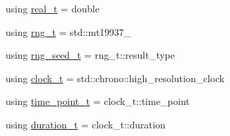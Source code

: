 \begin{DoxyCompactItemize}
\item 
using \hyperlink{namespace_designar_aca2c32af26808dbec1f3a3071fad25ce}{real\+\_\+t} = double
\item 
using \hyperlink{namespace_designar_a9ca84e2ff5daa62ebc4dab52f3a6c855}{rng\+\_\+t} = std\+::mt19937\+\_
\item 
using \hyperlink{namespace_designar_ad621b5646d45288c5d6a1e1dfe7531a8}{rng\+\_\+seed\+\_\+t} = rng\+\_\+t\+::result\+\_\+type
\item 
using \hyperlink{namespace_designar_a4892484bd553fb9ec4b8a559a83a415c}{clock\+\_\+t} = std\+::chrono\+::high\+\_\+resolution\+\_\+clock
\item 
using \hyperlink{namespace_designar_a0edbd598eadb672df2c70e5af4dfccee}{time\+\_\+point\+\_\+t} = clock\+\_\+t\+::time\+\_\+point
\item 
using \hyperlink{namespace_designar_a585b685c3d4f0d52edf0a6412caee626}{duration\+\_\+t} = clock\+\_\+t\+::duration
\end{DoxyCompactItemize}

